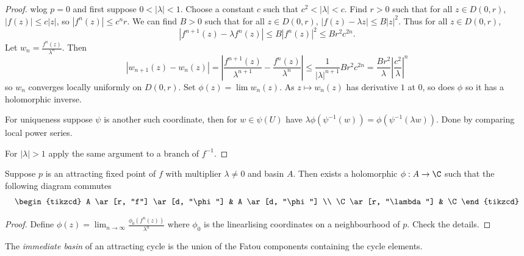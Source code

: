 \documentclass[a4paper]{article}
\begin{document}
\begin{proof}
  wlog \(p = 0\) and first suppose \(0 < |\lambda| < 1\). Choose a constant \(c\) such that \(c^2 < |\lambda| < c\). Find \(r > 0\) such that for all \(z \in D(0, r)\), \(|f(z)| \leq c |z|\), so \(|f^n(z)| \leq c^n r\). We can find \(B > 0\) such that for all \(z \in D(0, r)\), \(|f(z) - \lambda z| \leq B |z|^2\). Thus for all \(z \in D(0, r)\),
  \[
    |f^{n + 1}(z) - \lambda f^n(z)| \leq B |f^n(z)|^2 \leq B r^2 c^{2n}.
  \]
  Let \(w_n = \frac{f^n(z)}{\lambda^n}\). Then
  \[
    |w_{n + 1}(z) - w_n(z)|
    = \left| \frac{f^{n + 1}(z)}{\lambda^{n + 1}} - \frac{f^n(z)}{\lambda^n} \right|
    \leq \frac{1}{|\lambda|^{n + 1}} Br^2 c^{2n}
    = \frac{Br^2}{\lambda} \left|\frac{c^2}{\lambda}\right|^n
  \]
  so \(w_n\) converges locally uniformly on \(D(0, r)\). Set \(\phi(z) = \lim w_n(z)\). As \(z \mapsto w_n(z)\) has derivative \(1\) at \(0\), so does \(\phi\) so it has a holomorphic inverse.

  For uniqueness suppose \(\psi\) is another such coordinate, then for \(w \in \psi(U)\) have \(\lambda \phi(\psi^{-1}(w)) = \phi(\psi^{-1}(\lambda w))\). Done by comparing local power series.

  For \(|\lambda| > 1\) apply the same argument to a branch of \(f^{-1}\).
\end{proof}

\begin{corollary}
  Suppose \(p\) is an attracting fixed point of \(f\) with multiplier \(\lambda \ne 0\) and basin \(A\). Then exists a holomorphic \(\phi: A \to \C\) such that the following diagram commutes
  \[
    \begin{tikzcd}
      A \ar[r, "f"] \ar[d, "\phi"] & A \ar[d, "\phi"] \\
      \C \ar[r, "\lambda"] & \C
    \end{tikzcd}
  \]
\end{corollary}

\begin{proof}
  Define \(\phi(z) = \lim_{n \to \infty} \frac{\phi_0(f^n(z))}{\lambda^n}\) where \(\phi_0\) is the linearlising coordinates on a neighbourhood of \(p\). Check the details.
\end{proof}

\begin{definition}
  The \emph{immediate basin} of an attracting cycle is the union of the Fatou components containing the cycle elements.
\end{definition}







\printindex
\end{document}
